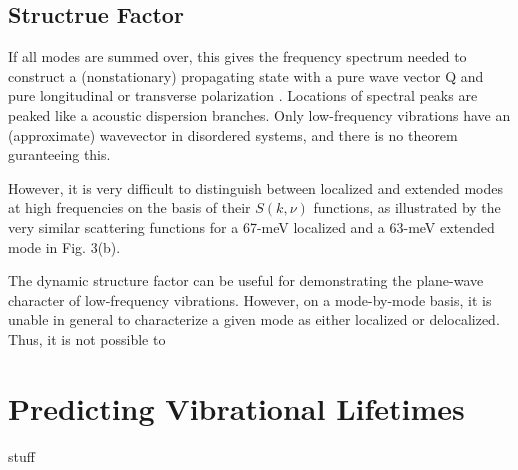 \documentclass[aps,prb,preprint,superscriptaddress,amsmath,amssymb,floatfix]{revtex4}
\begin{document}
\vspace*{100mm}




\subsection{\label{S:Lifetimes:}Structrue Factor}
If all modes are summed over, this gives the frequency spectrum
needed to construct a (nonstationary) propagating state with a
pure wave vector Q and pure longitudinal or transverse polarization
 \cite{feldman_thermal_1993}. Locations of spectral peaks are peaked 
like a acoustic dispersion branches. Only low-frequency vibrations 
have an (approximate) wavevector in disordered systems, and there is 
no theorem guranteeing this. \cite{feldman_numerical_1999}

However, it is very
difficult to distinguish between localized and extended
modes at high frequencies on the basis of their $S(k,\nu)$
functions, as illustrated by the very similar scattering
functions for a 67-meV localized and a 63-meV extended
mode in Fig. 3(b). \cite{biswas_vibrational_1988}

The dynamic structure factor can be useful for demonstrating the 
plane-wave character of low-frequency vibrations.  However, on a 
mode-by-mode basis, it is unable in general to characterize a given mode 
as either localized or delocalized.  Thus, it is not possible to 

\vspace*{100mm}

\appendix
\section{\label{A-Predicting-Phonons}Predicting Vibrational Lifetimes}

stuff


\clearpage


\end{document}
